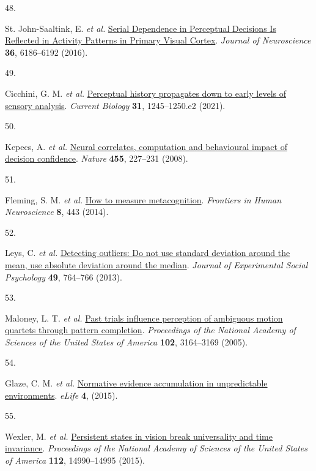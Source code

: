 \documentclass[
]{article}
\newlength{\cslhangindent}
\newlength{\csllabelwidth}
\newlength{\cslentryspacingunit} %
\newenvironment{CSLReferences}[2] %
 {%
  \setlength{\parindent}{0pt}
  \ifodd #1
  \let\oldpar\par
  \def\par{\hangindent=\cslhangindent\oldpar}
  \fi
  \setlength{\parskip}{#2\cslentryspacingunit}
 }%
 {}
\newcommand{\CSLLeftMargin}[1]{\parbox[t]{\csllabelwidth}{#1}}
\newcommand{\CSLRightInline}[1]{\parbox[t]{\linewidth - \csllabelwidth}{#1}\break}
\begin{document}
\begin{CSLReferences}{0}{0}
\leavevmode{}%
\CSLLeftMargin{48. }%
\CSLRightInline{St. John-Saaltink, E. \emph{et al.}
\href{https://doi.org/10.1523/JNEUROSCI.4390-15.2016}{{Serial Dependence
in Perceptual Decisions Is Reflected in Activity Patterns in Primary
Visual Cortex}}. \emph{Journal of Neuroscience} \textbf{36}, 6186--6192
(2016).}

\leavevmode{}%
\CSLLeftMargin{49. }%
\CSLRightInline{Cicchini, G. M. \emph{et al.}
\href{https://doi.org/10.1016/j.cub.2020.12.004}{{Perceptual history
propagates down to early levels of sensory analysis}}. \emph{Current
Biology} \textbf{31}, 1245--1250.e2 (2021).}

\leavevmode{}%
\CSLLeftMargin{50. }%
\CSLRightInline{Kepecs, A. \emph{et al.}
\href{https://doi.org/10.1038/nature07200}{{Neural correlates,
computation and behavioural impact of decision confidence}}.
\emph{Nature} \textbf{455}, 227--231 (2008).}

\leavevmode{}%
\CSLLeftMargin{51. }%
\CSLRightInline{Fleming, S. M. \emph{et al.}
\href{https://doi.org/10.3389/fnhum.2014.00443}{{How to measure
metacognition}}. \emph{Frontiers in Human Neuroscience} \textbf{8}, 443
(2014).}

\leavevmode{}%
\CSLLeftMargin{52. }%
\CSLRightInline{Leys, C. \emph{et al.}
\href{https://doi.org/10.1016/J.JESP.2013.03.013}{{Detecting outliers:
Do not use standard deviation around the mean, use absolute deviation
around the median}}. \emph{Journal of Experimental Social Psychology}
\textbf{49}, 764--766 (2013).}

\leavevmode{}%
\CSLLeftMargin{53. }%
\CSLRightInline{Maloney, L. T. \emph{et al.}
\href{https://doi.org/10.1073/pnas.0407157102}{{Past trials influence
perception of ambiguous motion quartets through pattern completion}}.
\emph{Proceedings of the National Academy of Sciences of the United
States of America} \textbf{102}, 3164--3169 (2005).}

\leavevmode{}%
\CSLLeftMargin{54. }%
\CSLRightInline{Glaze, C. M. \emph{et al.}
\href{https://doi.org/10.7554/eLife.08825}{{Normative evidence
accumulation in unpredictable environments}}. \emph{eLife} \textbf{4},
(2015).}

\leavevmode{}%
\CSLLeftMargin{55. }%
\CSLRightInline{Wexler, M. \emph{et al.}
\href{https://doi.org/10.1073/pnas.1508847112}{{Persistent states in
vision break universality and time invariance}}. \emph{Proceedings of
the National Academy of Sciences of the United States of America}
\textbf{112}, 14990--14995 (2015).}


\end{CSLReferences}
\end{document}

